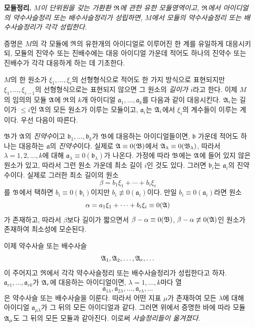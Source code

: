 \medskip
\noindent\textbf{모듈정리.} \emph{\(M\)이 단위원을 갖는 가환환 \(\mathfrak{R}\)에 관한 유한 모듈영역이고, \(\mathfrak{R}\)에서 아이디얼의 약수사슬정리 또는 배수사슬정리가 성립하면, \(M\)에서 모듈의 약수사슬정리 또는 배수사슬정리가 각각 성립한다.}

증명은 \(M\)의 각 모듈에 \(\mathfrak{R}\)의 유한개의 아이디얼로 이루어진 한 계를 유일하게 대응시키되, 모듈의 진약수 또는 진배수에는 대응 아이디얼 가운데 적어도 하나의 진약수 또는 진배수가 각각 대응하게 하는 데 기초한다.

\(M\)의 한 원소가 \(\xi_1,\ldots,\xi_i\)의 선형형식으로 적어도 한 가지 방식으로 표현되지만 \(\xi_1,\ldots,\xi_{i-1}\)의 선형형식으로는 표현되지 않으면 그 원소의 \emph{길이가 \(i\)}라고 한다. 이제 \(M\)의 임의의 모듈 \(\mathfrak A\)에 \(\mathfrak{R}\)의 \(k\)개 아이디얼 \(\mathfrak a_1,\ldots,\mathfrak a_k\)를 다음과 같이 대응시킨다. \(\mathfrak A_i\)는 길이가 \(\le i\)인 \(\mathfrak A\)의 모든 원소가 이루는 모듈이고, \(\mathfrak a_i\)는 \(\mathfrak A_i\)에서 \(\xi_i\)의 계수들이 이루는 계이다. 우선 다음이 따른다.

\(\mathfrak B\)가 \(\mathfrak A\)의 \emph{진약수}이고 \(\mathfrak b_1,\ldots,\mathfrak b_k\)가 \(\mathfrak B\)에 대응하는 아이디얼들이면, \(\mathfrak b\) 가운데 적어도 하나는 대응하는 \(\mathfrak a\)의 \emph{진약수}이다. 실제로 \(\mathfrak A\equiv0(\mathfrak B)\)에서 \(\mathfrak A_\lambda\equiv0(\mathfrak B_\lambda)\), 따라서 \(\lambda=1,2,\ldots,k\)에 대해 \(\mathfrak a_\lambda\equiv0(\mathfrak b_\lambda)\)가 나온다. 가정에 따라 \(\mathfrak B\)에는 \(\mathfrak A\)에 들어 있지 않은 원소가 있고, 따라서 그런 원소 가운데 최소 길이 \(i\)인 것도 있다. 그러면 \(\mathfrak b_i\)는 \(\mathfrak a_i\)의 진약수이다. 실제로 그러한 최소 길이의 원소
\[
        \beta=b_1\xi_1+\cdots+b_i\xi_i
\]
를 \(\mathfrak B\)에서 택하면 \(b_i\equiv0(\mathfrak b_i)\)이지만 \(b_i\not\equiv0(\mathfrak a_i)\)이다. 만일 \(b_i\equiv0(\mathfrak a_i)\)라면 원소
\[
        \alpha=a_1\xi_1+\cdots+b_i\xi_i\equiv0(\mathfrak A)
\]
가 존재하고, 따라서 \(\beta\)보다 길이가 짧으면서 \(\beta-\alpha\equiv0(\mathfrak B)\), \(\beta-\alpha\not\equiv0(\mathfrak A)\)인 원소가 존재하여 최소성에 모순된다.

이제 약수사슬 또는 배수사슬
\[
        \mathfrak A_1,\mathfrak A_2,\ldots,\mathfrak A_r,\ldots
\]
이 주어지고 \(\mathfrak{R}\)에서 각각 약수사슬정리 또는 배수사슬정리가 성립한다고 하자. \(\mathfrak a_{r1},\ldots,\mathfrak a_{rk}\)가 \(\mathfrak A_r\)에 대응하는 아이디얼이면, \(\lambda=1,\ldots,k\)마다 열
\[
        \mathfrak a_{1\lambda},\mathfrak a_{2\lambda},\ldots,\mathfrak a_{r\lambda},\ldots
\]
은 약수사슬 또는 배수사슬을 이룬다. 따라서 어떤 지표 \(\mu\)가 존재하여 모든 \(\lambda\)에 대해 아이디얼 \(\mathfrak a_{\mu\lambda}\)가 그 뒤의 모든 아이디얼과 같다. 그러면 위에서 증명한 바에 따라 모듈 \(\mathfrak A_\mu\)도 그 뒤의 모든 모듈과 같아진다. 이로써 \emph{사슬정리들이 옮겨졌다}.

